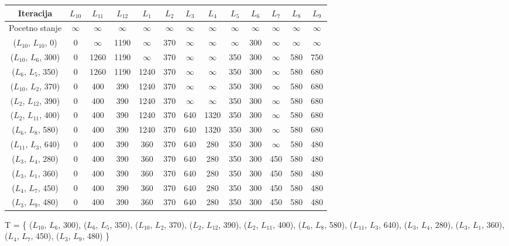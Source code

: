 \documentclass[12pt]{article}
\begin{document}
\begin{tabular}{ | c || c  | c | c | c | c | c | c | c | c | c | c | c | }
\hline
Iteracija & \(L_{10}\) & \(L_{11}\) & \(L_{12}\) & \(L_{1}\) & \(L_{2}\) & \(L_{3}\) & \(L_{4}\) & \(L_{5}\) & \(L_{6}\) & \(L_{7}\) & \(L_{8}\) & \(L_{9}\)\\
 \hline
 \hline
Pocetno stanje & $\infty$ & $\infty$ & $\infty$ & $\infty$ & $\infty$ & $\infty$ & $\infty$ & $\infty$ & $\infty$ & $\infty$ & $\infty$ & $\infty$\\
 \hline
(\(L_{10}\), \(L_{10}\), 0) & 0 & $\infty$ & 1190 & $\infty$ & 370 & $\infty$ & $\infty$ & $\infty$ & 300 & $\infty$ & $\infty$ & $\infty$\\
 \hline
(\(L_{10}\), \(L_{6}\), 300) & 0 & 1260 & 1190 & $\infty$ & 370 & $\infty$ & $\infty$ & 350 & 300 & $\infty$ & 580 & 750\\
 \hline
(\(L_{6}\), \(L_{5}\), 350) & 0 & 1260 & 1190 & 1240 & 370 & $\infty$ & $\infty$ & 350 & 300 & $\infty$ & 580 & 680\\
 \hline
(\(L_{10}\), \(L_{2}\), 370) & 0 & 400 & 390 & 1240 & 370 & $\infty$ & $\infty$ & 350 & 300 & $\infty$ & 580 & 680\\
 \hline
(\(L_{2}\), \(L_{12}\), 390) & 0 & 400 & 390 & 1240 & 370 & $\infty$ & $\infty$ & 350 & 300 & $\infty$ & 580 & 680\\
 \hline
(\(L_{2}\), \(L_{11}\), 400) & 0 & 400 & 390 & 1240 & 370 & 640 & 1320 & 350 & 300 & $\infty$ & 580 & 680\\
 \hline
(\(L_{6}\), \(L_{8}\), 580) & 0 & 400 & 390 & 1240 & 370 & 640 & 1320 & 350 & 300 & $\infty$ & 580 & 680\\
 \hline
(\(L_{11}\), \(L_{3}\), 640) & 0 & 400 & 390 & 360 & 370 & 640 & 280 & 350 & 300 & $\infty$ & 580 & 480\\
 \hline
(\(L_{3}\), \(L_{4}\), 280) & 0 & 400 & 390 & 360 & 370 & 640 & 280 & 350 & 300 & 450 & 580 & 480\\
 \hline
(\(L_{3}\), \(L_{1}\), 360) & 0 & 400 & 390 & 360 & 370 & 640 & 280 & 350 & 300 & 450 & 580 & 480\\
 \hline
(\(L_{4}\), \(L_{7}\), 450) & 0 & 400 & 390 & 360 & 370 & 640 & 280 & 350 & 300 & 450 & 580 & 480\\
 \hline
(\(L_{3}\), \(L_{9}\), 480) & 0 & 400 & 390 & 360 & 370 & 640 & 280 & 350 & 300 & 450 & 580 & 480\\
 \hline
\end{tabular}


T =  \{ (\(L_{10}\), \(L_{6}\), 300), (\(L_{6}\), \(L_{5}\), 350), (\(L_{10}\), \(L_{2}\), 370), (\(L_{2}\), \(L_{12}\), 390), (\(L_{2}\), \(L_{11}\), 400), (\(L_{6}\), \(L_{8}\), 580), (\(L_{11}\), \(L_{3}\), 640), (\(L_{3}\), \(L_{4}\), 280), (\(L_{3}\), \(L_{1}\), 360), (\(L_{4}\), \(L_{7}\), 450), (\(L_{3}\), \(L_{9}\), 480) \}
\end{document}
